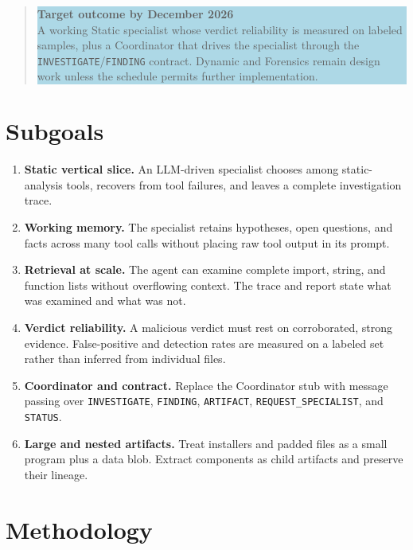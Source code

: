 \documentclass[11pt,a4paper]{article}
\newcommand{\code}[1]{\texttt{\small #1}}
\begin{document}
\begin{quote}
\colorbox{lightblue}{\parbox{0.93\linewidth}{
\textbf{\textcolor{mirablue}{Target outcome by December 2026}}\\
A working Static specialist whose verdict reliability is measured on labeled samples, plus a Coordinator that drives the specialist through the \code{INVESTIGATE}/\code{FINDING} contract. Dynamic and Forensics remain design work unless the schedule permits further implementation.
}}
\end{quote}

\section{Subgoals}

\begin{enumerate}
  \item \textbf{Static vertical slice.} An LLM-driven specialist chooses among static-analysis tools, recovers from tool failures, and leaves a complete investigation trace.
  \item \textbf{Working memory.} The specialist retains hypotheses, open questions, and facts across many tool calls without placing raw tool output in its prompt.
  \item \textbf{Retrieval at scale.} The agent can examine complete import, string, and function lists without overflowing context. The trace and report state what was examined and what was not.
  \item \textbf{Verdict reliability.} A malicious verdict must rest on corroborated, strong evidence. False-positive and detection rates are measured on a labeled set rather than inferred from individual files.
  \item \textbf{Coordinator and contract.} Replace the Coordinator stub with message passing over \code{INVESTIGATE}, \code{FINDING}, \code{ARTIFACT}, \code{REQUEST\_SPECIALIST}, and \code{STATUS}.
  \item \textbf{Large and nested artifacts.} Treat installers and padded files as a small program plus a data blob. Extract components as child artifacts and preserve their lineage.
\end{enumerate}

\section{Methodology}
\end{document}
